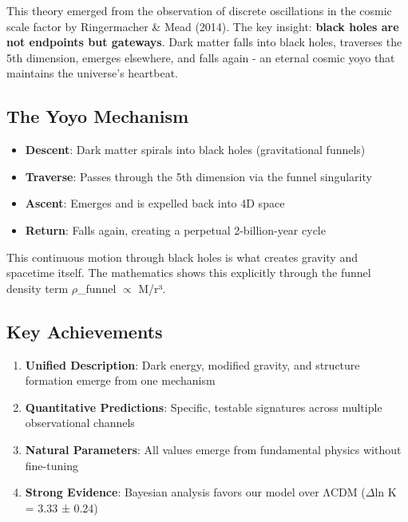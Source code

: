 \documentclass[
  11pt,
]{report}
\providecommand{\tightlist}{%
  \setlength{\itemsep}{0pt}\setlength{\parskip}{0pt}}
\begin{document}
This theory emerged from the observation of discrete oscillations in the
cosmic scale factor by Ringermacher \& Mead (2014). The key insight:
\textbf{black holes are not endpoints but gateways}. Dark matter falls
into black holes, traverses the 5th dimension, emerges elsewhere, and
falls again - an eternal cosmic yoyo that maintains the universe's
heartbeat.

\subsection{The Yoyo Mechanism}\label{the-yoyo-mechanism}

\begin{itemize}
\tightlist
\item
  \textbf{Descent}: Dark matter spirals into black holes (gravitational
  funnels)
\item
  \textbf{Traverse}: Passes through the 5th dimension via the funnel
  singularity
\item
  \textbf{Ascent}: Emerges and is expelled back into 4D space
\item
  \textbf{Return}: Falls again, creating a perpetual 2-billion-year
  cycle
\end{itemize}

This continuous motion through black holes is what creates gravity and
spacetime itself. The mathematics shows this explicitly through the
funnel density term \(\rho\)\_funnel \(\propto\) M/r³.

\subsection{Key Achievements}\label{key-achievements}

\begin{enumerate}
\def\labelenumi{\arabic{enumi}.}
\tightlist
\item
  \textbf{Unified Description}: Dark energy, modified gravity, and
  structure formation emerge from one mechanism
\item
  \textbf{Quantitative Predictions}: Specific, testable signatures
  across multiple observational channels
\item
  \textbf{Natural Parameters}: All values emerge from fundamental
  physics without fine-tuning
\item
  \textbf{Strong Evidence}: Bayesian analysis favors our model over ΛCDM
  (\(\Delta\)ln K = 3.33 ± 0.24)
\end{enumerate}
\end{document}
